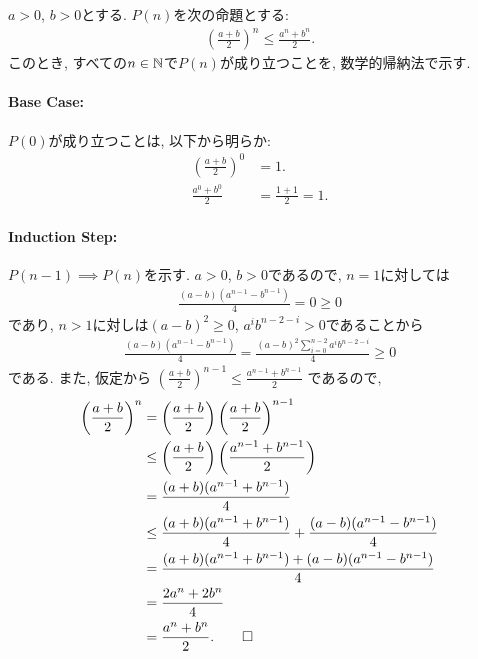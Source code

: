 \begin{proof*}
  $a>0$, $b>0$とする.
  $P(n)$を次の命題とする:
  \begin{align*}
    \left(\frac{a+b}{2}\right)^n\leq \frac{a^n+b^n}{2}
    .
  \end{align*}
  このとき,
  すべての$n\in\mathbb{N}$で$P(n)$が成り立つことを,
  数学的帰納法で示す.

  \paragraph{Base Case:}
  $P(0)$が成り立つことは, 以下から明らか:
  \begin{align*}
    \left(\frac{a+b}{2}\right)^0&=1.\\
    \frac{a^0+b^0}{2}&=\frac{1+1}{2}=1.
  \end{align*}
  \paragraph{Induction Step:}
  $P(n-1)\implies P(n)$を示す.
  $a>0$, $b>0$であるので,
  $n=1$に対しては
  \begin{align*}
    \frac{(a-b)(a^{n-1}-b^{n-1})}{4}=0\geq 0
  \end{align*}
  であり,
  $n>1$に対しは$(a-b)^2\geq 0$, $a^{i}b^{n-2-i}>0$であることから
  \begin{align*}
    \frac{(a-b)(a^{n-1}-b^{n-1})}{4}=\frac{(a-b)^2\sum_{i=0}^{n-2}a^{i}b^{n-2-i}}{4}\geq 0
  \end{align*}
  である.
  また,
  仮定から
  $\left(\frac{a+b}{2}\right)^{n-1}\leq \frac{a^{n-1}+b^{n-1}}{2}$
  であるので,
  \begin{align*}
    \left(\frac{a+b}{2}\right)^{n}
    &=
    \left(\frac{a+b}{2}\right)\left(\frac{a+b}{2}\right)^{n-1}\\
    &\leq
    \left(\frac{a+b}{2}\right)\left(\frac{a^{n-1}+b^{n-1}}{2}\right)\\
    &=
    \frac{(a+b)(a^{n-1}+b^{n-1})}{4}\\
    &\leq
    \frac{(a+b)(a^{n-1}+b^{n-1})}{4}
    +\frac{(a-b)(a^{n-1}-b^{n-1})}{4}\\
    &=
    \frac{(a+b)(a^{n-1}+b^{n-1})+(a-b)(a^{n-1}-b^{n-1})}{4}\\
    &=
    \frac{2a^n+2b^n}{4}\\
    &=
    \frac{a^n+b^n}{2}
    .\qedhere
  \end{align*}
\end{proof*}



